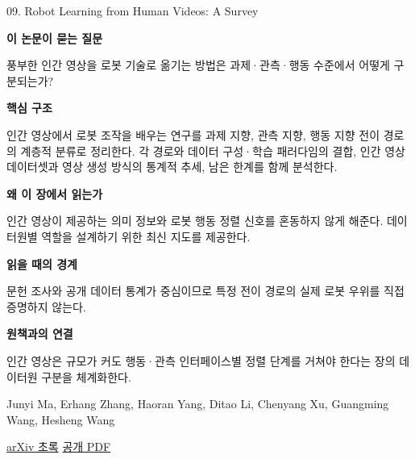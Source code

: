 \documentclass[11pt,openany]{book}
\begin{document}
\begin{termcard}{09. Robot Learning from Human Videos: A Survey}

\par

\medskip

{\sffamily\bfseries\color{deepblue} 이 논문이 묻는 질문}\par

풍부한 인간 영상을 로봇 기술로 옮기는 방법은 과제·관측·행동 수준에서 어떻게 구분되는가?

\smallskip

{\sffamily\bfseries\color{deepblue} 핵심 구조}\par

인간 영상에서 로봇 조작을 배우는 연구를 과제 지향, 관측 지향, 행동 지향 전이 경로의 계층적 분류로 정리한다. 각 경로와 데이터 구성·학습 패러다임의 결합, 인간 영상 데이터셋과 영상 생성 방식의 통계적 추세, 남은 한계를 함께 분석한다.

\smallskip

{\sffamily\bfseries\color{deepblue} 왜 이 장에서 읽는가}\par

인간 영상이 제공하는 의미 정보와 로봇 행동 정렬 신호를 혼동하지 않게 해준다. 데이터원별 역할을 설계하기 위한 최신 지도를 제공한다.

\smallskip

{\sffamily\bfseries\color{coral} 읽을 때의 경계}\par

문헌 조사와 공개 데이터 통계가 중심이므로 특정 전이 경로의 실제 로봇 우위를 직접 증명하지 않는다.

\smallskip

{\sffamily\bfseries\color{teal} 원책과의 연결}\par

인간 영상은 규모가 커도 행동·관측 인터페이스별 정렬 단계를 거쳐야 한다는 장의 데이터원 구분을 체계화한다.

\medskip

{\footnotesize\color{muted} Junyi Ma, Erhang Zhang, Haoran Yang, Ditao Li, Chenyang Xu, Guangming Wang, Hesheng Wang\par

\href{https://arxiv.org/abs/2604.27621}{arXiv 초록} \quad \href{https://arxiv.org/pdf/2604.27621}{공개 PDF}\par}

\end{termcard}
\end{document}
